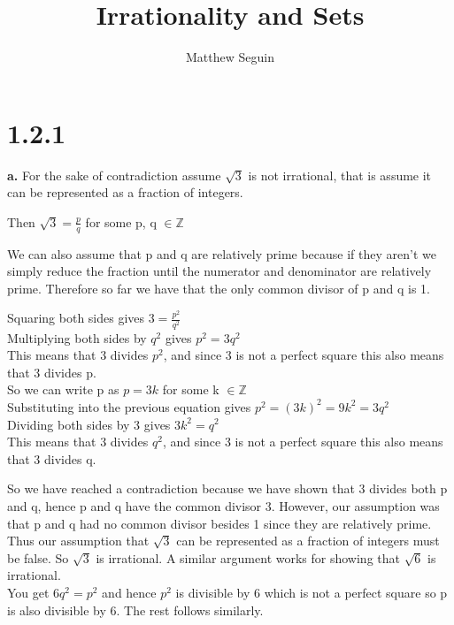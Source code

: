 \documentclass{article}
\title{Irrationality and Sets}
\author{Matthew Seguin}
\date{}
\begin{document}
\maketitle

\section*{1.2.1}

{\Large \textbf{a.}} For the sake of contradiction assume $\sqrt{3}$ is not irrational, that is assume it can be represented as a fraction of integers.
\begin{center}
    \doublespacing
    Then $\sqrt{3} = \frac{p}{q}$ for some p, q $\in \mathbb{Z}$
    \begin{singlespace}
        We can also assume that p and q are relatively prime because if they aren't we simply reduce the fraction until the numerator and denominator are relatively prime. Therefore so far we have that the only common divisor of p and q is 1.
    \end{singlespace}
    Squaring both sides gives $3 = \frac{p^2}{q^2}$
    \\Multiplying both sides by $q^2$ gives $p^2 = 3q^2$
    \\This means that 3 divides $p^2$, and since 3 is not a perfect square this also means that 3 divides p.
    \\So we can write p as $p=3k$ for some k $\in \mathbb{Z}$
    \\Substituting into the previous equation gives $p^2 = (3k)^2 = 9k^2 = 3q^2$
    \\Dividing both sides by 3 gives $3k^2 = q^2$
    \\This means that 3 divides $q^2$, and since 3 is not a perfect square this also means that 3 divides q.
    \begin{singlespace}
        So we have reached a contradiction because we have shown that 3 divides both p and q, hence p and q have the common divisor 3. However, our assumption was that p and q had no common divisor besides 1 since they are relatively prime. Thus our assumption that $\sqrt{3}$ can be represented as a fraction of integers must be false. So $\sqrt{3}$ is irrational. \qedsymbol
        \newline
        \newline A similar argument works for showing that $\sqrt{6}$ is irrational.
        \\You get $6q^2 = p^2$ and hence $p^2$ is divisible by 6 which is not a perfect square so p is also divisible by 6. The rest follows similarly.
    \end{singlespace}
\end{center}
\end{document}
